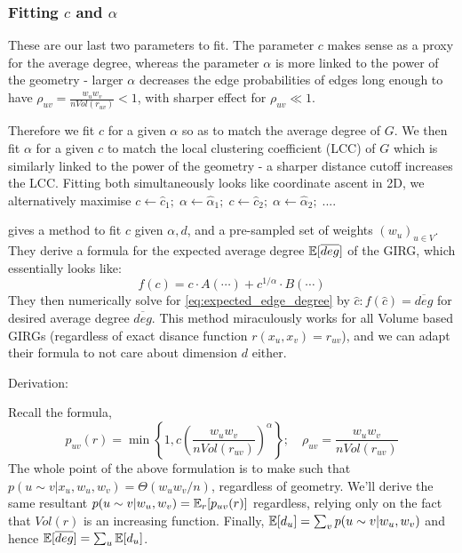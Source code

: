 \subsubsection{Fitting $c$ and $\alpha$}
These are our last two parameters to fit.
The parameter $c$ makes sense as a proxy for the average degree, whereas the parameter $\alpha$ is more linked to the power of the geometry - larger $\alpha$ decreases the edge probabilities of edges long enough to have $\rho_{uv} = \frac{w_u w_v}{n Vol(r_{uv})} < 1$, with sharper effect for $\rho_{uv} \ll 1$.

Therefore we fit $c$ for a given $\alpha$ so as to match the average degree of $G$. We then fit $\alpha$ for a given $c$ to match the local clustering coefficient (LCC) of $G$ which is similarly linked to the power of the geometry - a sharper distance cutoff increases the LCC. Fitting both simultaneously looks like coordinate ascent in 2D, we alternatively maximise $c \gets \hat{c}_1;\; \alpha \gets \hat{\alpha}_1;\; c \gets \hat{c}_2;\; \alpha \gets \hat{\alpha}_2;\; ...$.

\cite{blasius2018towards} gives a method to fit $c$ given $\alpha, d$, and a pre-sampled set of weights $(w_u)_{u \in V}$. They derive a formula for the expected average degree $\mathbb{E}[\overline{deg}]$ of the GIRG, which essentially looks like:
\begin{equation}
    \label{eq:expected_edge_degree}
    f(c) = c \cdot A(\cdots) + c^{1/\alpha} \cdot B(\cdots)
\end{equation}
They then numerically solve for \cref{eq:expected_edge_degree} by $\hat{c}: f(\hat{c}) = \overline{deg}$ for desired average degree $\overline{deg}$. This method miraculously works for all Volume based GIRGs (regardless of exact disance function $r(x_u, x_v) = r_{uv}$), and we can adapt their formula to not care about dimension $d$ either.

Derivation:

Recall the formula,
\begin{equation}
    p_{uv}(r) = \min \left \{ 
        1,
        c \left (
            \frac{w_u w_v}{n Vol(r_{uv})}
        \right )^\alpha    
    \right \}; \quad \rho_{uv} = \frac{w_u w_v}{n Vol(r_{uv})}
\end{equation}
The whole point of the above formulation is to make such that $p(u \sim v | x_u, w_u, w_v) = \Theta(w_u w_v/n)$, regardless of geometry. We'll derive the same resultant $p(u \sim v | w_u, w_v) = \mathbb{E}_r[p_{uv}(r)]$ regardless, relying only on the fact that $Vol(r)$ is an increasing function. Finally, $\mathbb{E}[d_u] = \sum_v p(u \sim v | w_u, w_v)$ and hence $\mathbb{E}[\overline{deg}] = \sum_u \mathbb{E}[d_u]$.

